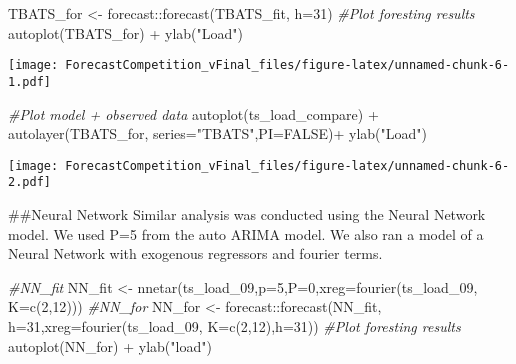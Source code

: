 \documentclass[
]{article}
\newenvironment{Shaded}{\begin{snugshade}}{\end{snugshade}}
\newcommand{\AttributeTok}[1]{\textcolor[rgb]{0.77,0.63,0.00}{#1}}
\newcommand{\CommentTok}[1]{\textcolor[rgb]{0.56,0.35,0.01}{\textit{#1}}}
\newcommand{\ConstantTok}[1]{\textcolor[rgb]{0.00,0.00,0.00}{#1}}
\newcommand{\DecValTok}[1]{\textcolor[rgb]{0.00,0.00,0.81}{#1}}
\newcommand{\FunctionTok}[1]{\textcolor[rgb]{0.00,0.00,0.00}{#1}}
\newcommand{\NormalTok}[1]{#1}
\newcommand{\OtherTok}[1]{\textcolor[rgb]{0.56,0.35,0.01}{#1}}
\newcommand{\SpecialCharTok}[1]{\textcolor[rgb]{0.00,0.00,0.00}{#1}}
\newcommand{\StringTok}[1]{\textcolor[rgb]{0.31,0.60,0.02}{#1}}
\begin{document}
\begin{Shaded}
\begin{Highlighting}[]
\NormalTok{TBATS\_for }\OtherTok{\textless{}{-}}\NormalTok{ forecast}\SpecialCharTok{::}\FunctionTok{forecast}\NormalTok{(TBATS\_fit, }\AttributeTok{h=}\DecValTok{31}\NormalTok{)}
\CommentTok{\#Plot foresting results}
\FunctionTok{autoplot}\NormalTok{(TBATS\_for) }\SpecialCharTok{+}
  \FunctionTok{ylab}\NormalTok{(}\StringTok{"Load"}\NormalTok{) }
\end{Highlighting}
\end{Shaded}

\texttt{[image: ForecastCompetition\_vFinal\_files/figure-latex/unnamed-chunk-6-1.pdf]}

\begin{Shaded}
\begin{Highlighting}[]
\CommentTok{\#Plot model + observed data}
\FunctionTok{autoplot}\NormalTok{(ts\_load\_compare) }\SpecialCharTok{+}
  \FunctionTok{autolayer}\NormalTok{(TBATS\_for, }\AttributeTok{series=}\StringTok{"TBATS"}\NormalTok{,}\AttributeTok{PI=}\ConstantTok{FALSE}\NormalTok{)}\SpecialCharTok{+}
  \FunctionTok{ylab}\NormalTok{(}\StringTok{"Load"}\NormalTok{) }
\end{Highlighting}
\end{Shaded}

\texttt{[image: ForecastCompetition\_vFinal\_files/figure-latex/unnamed-chunk-6-2.pdf]}

\#\#Neural Network Similar analysis was conducted using the Neural
Network model. We used P=5 from the auto ARIMA model. We also ran a
model of a Neural Network with exogenous regressors and fourier terms.

\begin{Shaded}
\begin{Highlighting}[]
\CommentTok{\#NN\_fit }
\NormalTok{NN\_fit }\OtherTok{\textless{}{-}} \FunctionTok{nnetar}\NormalTok{(ts\_load\_09,}\AttributeTok{p=}\DecValTok{5}\NormalTok{,}\AttributeTok{P=}\DecValTok{0}\NormalTok{,}\AttributeTok{xreg=}\FunctionTok{fourier}\NormalTok{(ts\_load\_09, }\AttributeTok{K=}\FunctionTok{c}\NormalTok{(}\DecValTok{2}\NormalTok{,}\DecValTok{12}\NormalTok{)))}
\CommentTok{\#NN\_for }
\NormalTok{NN\_for }\OtherTok{\textless{}{-}}\NormalTok{ forecast}\SpecialCharTok{::}\FunctionTok{forecast}\NormalTok{(NN\_fit, }\AttributeTok{h=}\DecValTok{31}\NormalTok{,}\AttributeTok{xreg=}\FunctionTok{fourier}\NormalTok{(ts\_load\_09, }\AttributeTok{K=}\FunctionTok{c}\NormalTok{(}\DecValTok{2}\NormalTok{,}\DecValTok{12}\NormalTok{),}\AttributeTok{h=}\DecValTok{31}\NormalTok{))}
\CommentTok{\#Plot foresting results}
\FunctionTok{autoplot}\NormalTok{(NN\_for) }\SpecialCharTok{+}
  \FunctionTok{ylab}\NormalTok{(}\StringTok{"load"}\NormalTok{) }
\end{Highlighting}
\end{Shaded}
\end{document}
